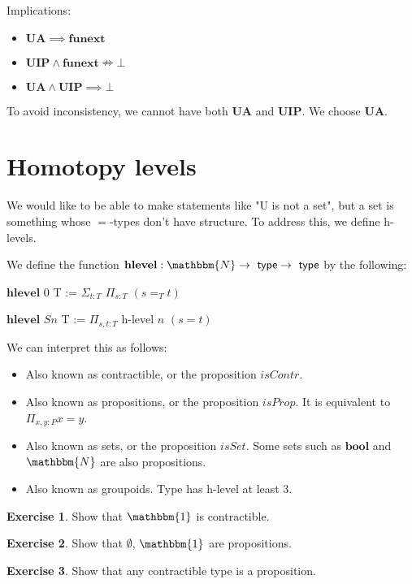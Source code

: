 \documentclass{amsart}
\theoremstyle{definition}
\newtheorem{ex}{Exercise}[section]
\newcommand{\N}{\mathbbm{N}}
\newcommand{\type}{\ensuremath{\mathsf{~type}}}
\begin{document}
Implications:
\begin{itemize}
    \item $\mathbf{UA \implies funext}$
    \item $\mathbf{UIP} \wedge \mathbf{funext} \nRightarrow \bot$ 
    \item $\mathbf{UA} \wedge \mathbf{UIP} \implies \bot$
\end{itemize}

To avoid inconsistency, we cannot have both $\mathbf{UA}$ and $\mathbf{UIP}$. We choose $\mathbf{UA}$. 

\section{Homotopy levels}
We would like to be able to make statements like "U is not a set", but a set is something whose $\mathbf{=}$-types don't have structure. To address this, we define h-levels.


We define the function $\mathbf{hlevel} : \N \rightarrow \type \rightarrow \type$ by the following:

$\mathbf{hlevel}$ 0 T := $\Sigma_{t : T}$ $\Pi_{s : T}$ $(s \mathbf{=}_T t)$

$\mathbf{hlevel}$ $S n$ T := $\Pi_{s,t : T}$ h-level $n$ $(s = t)$


We can interpret this as follows:
\begin{itemize}
\item[h-level 0:] Also known as contractible, or the proposition $isContr$.
\item[h-level 1:] Also known as propositions, or the proposition $isProp$. It is equivalent to $\Pi_{x,y:P} x = y$. %
\item[h-level 2:] Also known as sets, or the proposition $isSet$. Some sets such as $\textbf{bool}$ and $\N$ are also propositions.
\item[h-level 3:] Also known as groupoids. Type has h-level at least 3.
\end{itemize}

\begin{ex}
Show that $\mathbbm{1}$ is contractible.
\end{ex}

\begin{ex}
Show that $\emptyset$, $\mathbbm{1}$ are propositions.
\end{ex}

\begin{ex}
Show that any contractible type is a proposition.
\end{ex}
\end{document}
